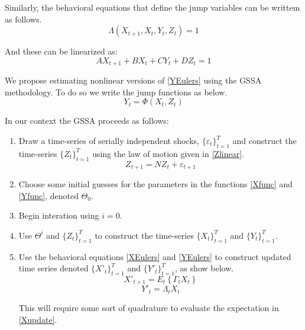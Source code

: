 \documentclass[letterpaper,12pt]{article}
\begin{document}
\begin{spacing}{1.5}
Similarly, the behavioral equations that define the jump variables can be writtem as follows.
\begin{equation}\label{YEulers}
\Lambda(X_{t+1},X_{t},Y_{t},Z_{t})=1
\end{equation}

And these can be linearized as:
\begin{equation}\label{YEulerslinear}
	A X_{t+1} + B X_{t} + C Y_{t} + D Z_{t}= 1
\end{equation}

We propose estimating nonlinear versions of \eqref{YEulers} using the GSSA methodology.  To do so we write the jump functions as below.
\begin{equation}\label{Yfunc}
	Y_{t} = \Phi(X_{t},Z_{t})
\end{equation}

In our context the GSSA proceeds as follows:
\begin{enumerate}
\item Draw a time-series of serially independent shocks, $\{\varepsilon_t\}_{t=1}^T$ and construct the time-series  $\{Z_t\}_{t=1}^T$ using the law of motion given in \eqref{Zlinear}.
\begin{equation}\label{Zlinear}
	Z_{t+1} =N Z_{t} + \varepsilon_{t+1}
\end{equation}

\item Choose some initial guesses for the parameters in the functions \eqref{Xfunc} and \eqref{Yfunc}, denoted $\Theta_0$.

\item Begin interation using $i=0$.

\item Use $\Theta^i$ and $\{Z_t\}_{t=1}^T$ to construct the time-series $\{X_t\}_{t=1}^T$ and $\{Y_t\}_{t=1}^T$.

\item Use the behavioral equations \eqref{XEulers} and \eqref{YEulers} to construct updated time series denoted $\{X'_t\}_{t=1}^T$ and $\{Y'_t\}_{t=1}^T$, as show below.
\begin{equation}\label{Xupdate}
	X'_{t+1} =E_t\left\{ \Gamma_t X_t\right\}
\end{equation}
\begin{equation}\label{Yupdate}
	Y'_{t} =\Lambda_t X_t
\end{equation}

This will require some sort of quadrature to evaluate the expectation in \eqref{Xupdate}.


\end{enumerate}
\end{spacing}
\end{document}
